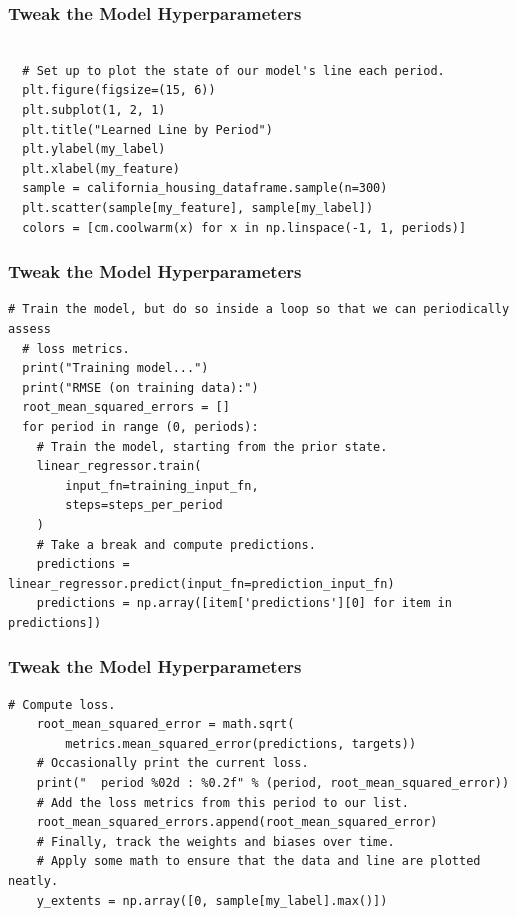 \begin{frame}[fragile]\frametitle{Tweak the Model Hyperparameters}
\begin{lstlisting}

  # Set up to plot the state of our model's line each period.
  plt.figure(figsize=(15, 6))
  plt.subplot(1, 2, 1)
  plt.title("Learned Line by Period")
  plt.ylabel(my_label)
  plt.xlabel(my_feature)
  sample = california_housing_dataframe.sample(n=300)
  plt.scatter(sample[my_feature], sample[my_label])
  colors = [cm.coolwarm(x) for x in np.linspace(-1, 1, periods)]
\end{lstlisting}
\end{frame}


\begin{frame}[fragile]\frametitle{Tweak the Model Hyperparameters}
\begin{lstlisting}
# Train the model, but do so inside a loop so that we can periodically assess
  # loss metrics.
  print("Training model...")
  print("RMSE (on training data):")
  root_mean_squared_errors = []
  for period in range (0, periods):
    # Train the model, starting from the prior state.
    linear_regressor.train(
        input_fn=training_input_fn,
        steps=steps_per_period
    )
    # Take a break and compute predictions.
    predictions = linear_regressor.predict(input_fn=prediction_input_fn)
    predictions = np.array([item['predictions'][0] for item in predictions])
\end{lstlisting}
\end{frame}

\begin{frame}[fragile]\frametitle{Tweak the Model Hyperparameters}
\begin{lstlisting}
# Compute loss.
    root_mean_squared_error = math.sqrt(
        metrics.mean_squared_error(predictions, targets))
    # Occasionally print the current loss.
    print("  period %02d : %0.2f" % (period, root_mean_squared_error))
    # Add the loss metrics from this period to our list.
    root_mean_squared_errors.append(root_mean_squared_error)
    # Finally, track the weights and biases over time.
    # Apply some math to ensure that the data and line are plotted neatly.
    y_extents = np.array([0, sample[my_label].max()])
\end{lstlisting}
\end{frame}

